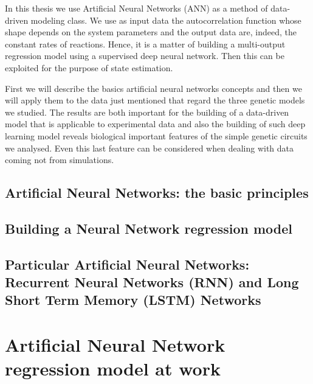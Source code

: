 \documentclass[12pt,a4paper]{report}
\begin{document}
In this thesis we use Artificial Neural Networks (ANN) as a method of data-driven modeling class. We use as input data the autocorrelation function whose shape depends on the system parameters and the output data are, indeed, the constant rates of reactions. Hence, it is a matter of building a multi-output regression model using a supervised deep neural network. Then this can be exploited for the purpose of state estimation.

First we will describe the basics artificial neural networks concepts and then we will apply them to the data just mentioned that regard the three genetic models we studied. The results are both important for the building of a data-driven model that is applicable to experimental data and also the building of such deep learning model reveals biological important features of the simple genetic circuits we analysed. Even this last feature can be considered when dealing with data coming not from simulations. 

\section{Artificial Neural Networks: the basic principles}

\section{Building a Neural Network regression model}

\section{Particular Artificial Neural Networks: Recurrent Neural Networks (RNN) and Long Short Term Memory (LSTM) Networks}

\chapter{Artificial Neural Network regression model at work}
\end{document}
